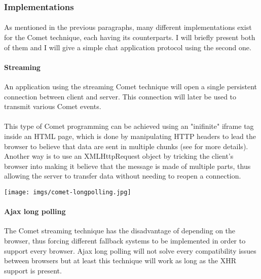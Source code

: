 \subsubsection{Implementations}

\paragraph{} As mentioned in the previous paragraphs, many different 
implementations exist for the Comet technique, each having its counterparts. I 
will briefly present both of them and I will give a simple chat 
application protocol using the second one.

\paragraph{Streaming} An application using the streaming Comet technique will 
open a single persistent connection between client and server. This connection 
will later be used to transmit various Comet events.
\paragraph{} This type of Comet programming can be achieved using an "inifinite"
iframe tag inside an HTML page, which is done by manipulating HTTP headers to 
lead the browser to believe that data are sent in multiple chunks (see  
\cite{webreference-infinite-iframe} 
for more details). Another way is to use an XMLHttpRequest object by tricking 
the client's browser into making it believe that the message is 
made of multiple parts, thus allowing the server to transfer data without 
needing to reopen a connection.


\begin{center}
    \texttt{[image: imgs/comet-longpolling.jpg]}
\end{center}

\paragraph{Ajax long polling} The Comet streaming technique has the 
disadvantage of depending on the browser, thus forcing different fallback 
systems to be implemented in order to support every browser. Ajax long polling 
will 
not solve every compatibility issues between browsers but at least this 
technique will work as long as the XHR support is present.

